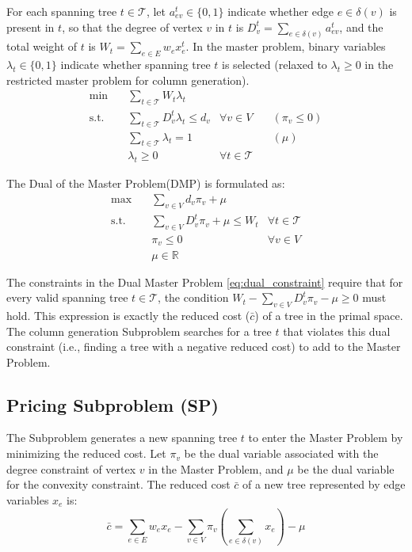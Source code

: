 \documentclass[12pt]{article}
\begin{document}
For each spanning tree $t \in \mathcal{T}$, let $a_{ev}^t \in \{0,1\}$ indicate whether edge $e \in \delta(v)$ is present in $t$, so that the degree of vertex $v$ in $t$ is $D_v^t = \sum_{e \in \delta(v)} a_{ev}^t$, and the total weight of $t$ is $W_t = \sum_{e \in E} w_e x_e^t$. 
In the master problem, binary variables $\lambda_t \in \{0,1\}$ indicate whether spanning tree $t$ is selected (relaxed to $\lambda_t \geq 0$ in the restricted master problem for column generation).
\begin{align}
\min \quad & \sum_{t \in \mathcal{T}} W_t \lambda_t \\
\text{s.t.} \quad & \sum_{t \in \mathcal{T}} D_v^t \lambda_t \leq d_v & \forall v \in V \quad & ( \pi_v \leq 0) \\
& \sum_{t \in \mathcal{T}} \lambda_t = 1 & & ( \mu) \\
& \lambda_t \geq 0 & \forall t \in \mathcal{T}
\end{align}

\noindent The Dual of the Master Problem(DMP) is formulated as:
\begin{align}
\max \quad & \sum_{v \in V} d_v \pi_v + \mu \\
\text{s.t.} \quad & \sum_{v \in V} D_v^t \pi_v + \mu \leq W_t & \forall t \in \mathcal{T} \label{eq:dual_constraint} \\
& \pi_v \leq 0 & \forall v \in V \\
& \mu \in \mathbb{R}
\end{align}

\noindent 
The constraints in the Dual Master Problem \eqref{eq:dual_constraint} require that for every valid spanning tree $t \in \mathcal{T}$, the condition $W_t - \sum_{v \in V} D_v^t \pi_v - \mu \geq 0$ must hold. This expression is exactly the {reduced cost} ($\bar{c}$) of a tree in the primal space. The column generation Subproblem searches for a tree $t$ that violates this dual constraint (i.e., finding a tree with a negative reduced cost) to add to the Master Problem.

\subsection{Pricing Subproblem (SP)}

The Subproblem generates a new spanning tree $t$ to enter the Master Problem by minimizing the reduced cost. Let $\pi_v$ be the dual variable associated with the degree constraint of vertex $v$ in the Master Problem, and $\mu$ be the dual variable for the convexity constraint. The reduced cost $\bar{c}$ of a new tree represented by edge variables $x_e$ is:
\begin{equation*}
\bar{c} = \sum_{e \in E} w_e x_e - \sum_{v \in V} \pi_v \left( \sum_{e \in \delta(v)} x_e \right) - \mu
\end{equation*}
\end{document}
